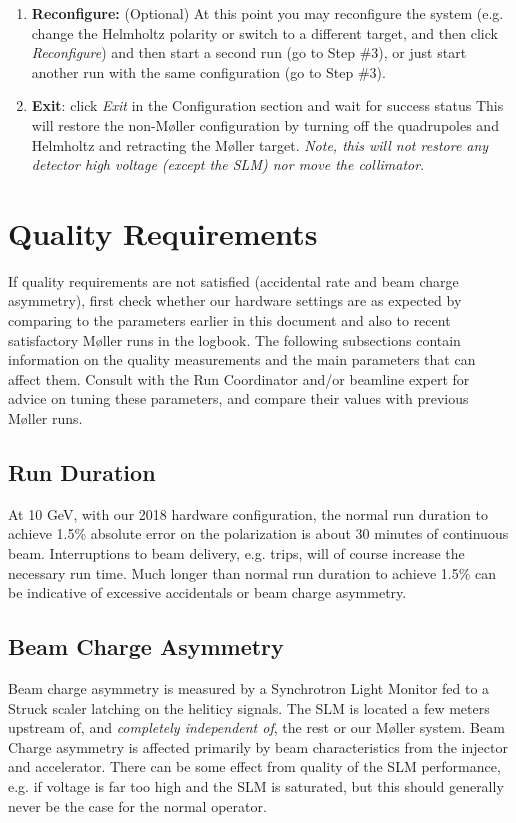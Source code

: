 \documentclass[amsmath,amssymb,notitlepage,12pt]{revtex4}
\begin{document}
\begin{enumerate}
\item {\bf Reconfigure:}  (Optional)  At this point you may reconfigure the system (e.g. change the Helmholtz polarity or switch to a different target, and then click {\em Reconfigure}) and then start a second run (go to Step \#3), or just start another run with the same configuration (go to Step \#3).
\item {\bf Exit}: click {\em Exit} in the Configuration section and wait for success status
    \subitem  This will restore the non-M{\o}ller configuration by turning off the quadrupoles and Helmholtz and retracting the M{\o}ller target.  {\em Note, this will not restore any detector high voltage (except the SLM) nor move the collimator}. 
\end{enumerate}


\section{Quality Requirements}\label{sec:knobs}

If quality requirements are not satisfied (accidental rate and beam charge asymmetry), first check whether our hardware settings are as expected by comparing to the parameters earlier in this document and also to recent satisfactory M{\o}ller runs in the logbook.  The following subsections contain information on the quality measurements and the main parameters that can affect them.  Consult with the Run Coordinator and/or beamline expert for advice on tuning these parameters, and compare their values with previous M{\o}ller runs.

\subsection{Run Duration}
At 10 GeV, with our 2018 hardware configuration, the normal run duration to achieve 1.5\% absolute error on the polarization is about 30 minutes of continuous beam.  Interruptions to beam delivery, e.g. trips, will of course increase the necessary run time.  Much longer than normal run duration to achieve 1.5\% can be indicative of excessive accidentals or beam charge asymmetry.

\subsection{Beam Charge Asymmetry}
Beam charge asymmetry is measured by a Synchrotron Light Monitor fed to a Struck scaler latching on the heliticy signals.  The SLM is located a few meters upstream of, and {\em completely independent of}, the rest or our M{\o}ller system.  Beam Charge asymmetry is affected primarily by beam characteristics from the injector and accelerator.  There can be some effect from quality of the SLM performance, e.g. if voltage is far too high and the SLM is saturated, but this should generally never be the case for the normal operator.
\end{document}
